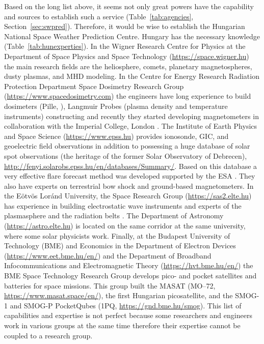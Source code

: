 \documentclass[sn-aps]{sn-jnl}%
\begin{document}
Based on the long list above, it seems not only great powers have the capability and sources to establish such a service (Table~\ref{tab:agencies}, Section~\ref{sec:swpred}). Therefore, it would be wise to establish the Hungarian National Space Weather Prediction Centre. Hungary has the necessary knowledge (Table~\ref{tab:hunexperties}). In the Wigner Research Centre for Physics at the Department of Space Physics and Space Technology (\url{https://space.wigner.hu}) the main research fields are the heliosphere, comets, planetary magnetospheres, dusty plasmas, and MHD modeling. In the Centre for Energy Research Radiation Protection Department Space Dosimetry Research Group (\url{https://www.spacedosimetry.com}) the engineers have long experience to build dosimeters (Pille, \cite{apathy02:_dose_hungar_pille_tld}), Langmuir Probes (plasma density and temperature instruments) constructing and recently they started developing magnetometers in collaboration with the Imperial College, London \cite{hirn22:_charac_radmag_radcub_iod}. The Institute of Earth Physics and Space Science (\url{https://www.epss.hu}) provides ionosonde, GIC, and geoelectric field observations in addition to possessing a huge database of solar spot observations (the heritage of the former Solar Observatory of Debrecen), \url{http://fenyi.solarobs.epss.hu/en/databases/Summary/}. Based on this database a very effective flare forecast method was developed supported by the ESA \cite{korsos14:_pre_dynam_sunsp_group,korsos15:_dynam_precur_flares_activ_region_noaa}. They also have experts on terrestrial bow shock and ground-based magnetometers. In the E{\"o}tv{\"o}s Lor{\'a}nd University, the Space Research Group (\url{https://sas2.elte.hu}) has experience in building electrostatic wave instruments and experts of the plasmasphere and the radiation belts \cite{lichtenberger08:_autom_whist_detec_analy,lichtenberger13}. The Department of Astronomy (\url{https://astro.elte.hu}) is located on the same corridor at the same university, where some solar physicists work. Finally, at the Budapest University of Technology (BME) and Economics in the Department of Electron Devices (\url{https://www.eet.bme.hu/en/}) and the Department of Broadband Infocommunications and Electromagnetic Theory (\url{https://hvt.bme.hu/en/}) the BME Space Technology Research Group develops pico- and pocket satellites and batteries for space missions. This group built the MASAT (MO–72, \url{https://www.masat.space/en/}), the first Hungarian picosatellite, and the SMOG-1 and SMOG-P PocketQubes (1PQ, \url{https://gnd.bme.hu/smog}). This list of capabilities and expertise is not perfect because some researchers and engineers work in various groups at the same time therefore their expertise cannot be coupled to a research group.
\end{document}
